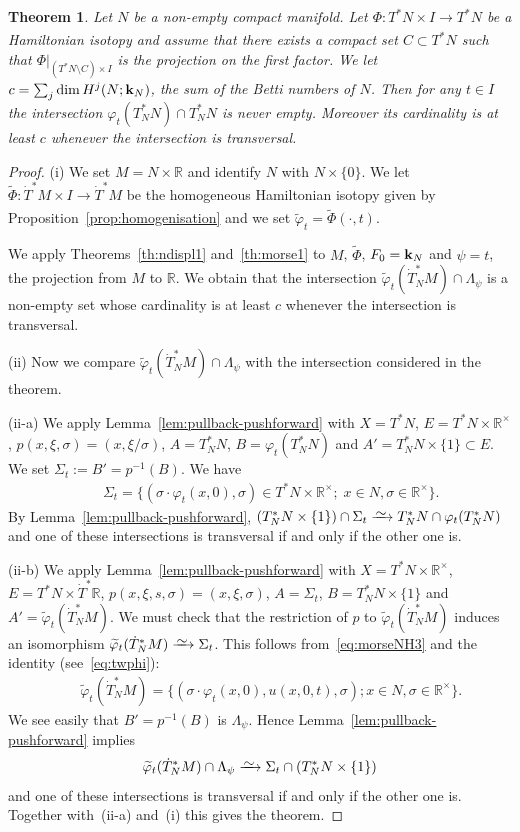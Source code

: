 \documentclass[12pt,leqno]{article}
\newtheorem{theorem}{Theorem}[section]
\theoremstyle{definition}
\newcommand{\R}{{\mathbb{R}}}
\def\phi{{\varphi}}
\newcommand{\cor}{{\bf k}}
\renewcommand{\to}[1][]{\xrightarrow[]{#1}}
\newcommand{\isoto}[1][]{\xrightarrow[#1]%
{{\raisebox{-.6ex}[0ex][-.6ex]{$\mspace{1mu}\sim\mspace{2mu}$}}}}
\newcommand{\opb}[1]{#1^{-1}}
\newcommand{\eqdot}{\mathbin{:=}}
\newcommand{\cl}{\colon}
\newcommand{\tw}[1]{\widetilde{#1}}
\newcommand{\eq}{\begin{eqnarray}}
\newcommand{\eneq}{\end{eqnarray}}
\newcommand{\eqn}{\begin{eqnarray*}}
\newcommand{\eneqn}{\end{eqnarray*}}
\newcommand{\dT}{{\dot{T}}}
\newcommand{\dTM}{{\dT}^*M}
\numberwithin{equation}{section}
\begin{document}
\begin{theorem}\label{thm:morseNH}
Let $N$ be a non-empty compact manifold.
Let $\Phi\cl T^*N\times I\to T^*N$ be a
Hamiltonian isotopy and assume that there exists a compact set $C\subset T^*N$ such
that $\Phi|_{(T^*N \setminus C) \times I}$ is the projection on the first
factor. We let $c=\sum_j\dim H^j(N;\cor_N)$, the sum
of the Betti numbers of $N$. 
Then for any $t\in I$ the intersection
$\phi_t(T^*_NN) \cap T^*_NN$ is never empty.
Moreover its cardinality is at
least $c$ whenever the intersection is transversal.
\end{theorem}
\begin{proof}
(i) We set $M=N\times \R$ and identify $N$ with $N\times\{0\}$.
We let $\tw\Phi\cl \dTM \times I \to \dTM$ be the homogeneous
Hamiltonian isotopy given by
Proposition~\ref{prop:homogenisation} and we set
$\tw\phi_t = \tw\Phi(\cdot,t)$.

We apply Theorems~\ref{th:ndispl1} and~\ref{th:morse1} to $M$, $\tw\Phi$,
$F_0 = \cor_N$ and $\psi = t$, the projection from $M$ to $\R$.
We obtain that the intersection $\tw\phi_t(\dT^*_NM) \cap \Lambda_\psi$
is a non-empty set whose cardinality is at least $c$ whenever
the intersection is transversal.
  
\medskip\noindent
(ii) Now we compare $\tw\phi_t(\dT^*_NM) \cap \Lambda_\psi$ with the
intersection considered in the theorem. 


\noindent
(ii-a)
We apply Lemma~\ref{lem:pullback-pushforward} with
$X = T^*N$, $E= T^*N \times \R^\times$, $p(x,\xi,\sigma) = (x,\xi/\sigma)$,
$A=T^*_NN$, $B= \phi_t(T^*_NN)$ and $A' = T^*_NN \times \{1\} \subset E$.
We set $\Sigma_t\eqdot B'=\opb{p}(B)$. We have
\eq\label{eq:morseNH3}
&&\Sigma_t=
\{(\sigma\cdot\phi_t(x,0),\sigma)\in T^*N\times\R^\times;\;
x\in N,\sigma\in\R^\times\}.
\eneq
By Lemma~\ref{lem:pullback-pushforward},
$(T^*_NN \times \{1\}) \cap \Sigma_t \isoto T^*_NN  \cap \phi_t(T^*_NN)$
and one of these intersections is transversal if and only if the other one
is.

\smallskip\noindent
(ii-b)
We apply Lemma~\ref{lem:pullback-pushforward} with
$X = T^*N\times \R^\times$, $E = T^*N \times \dT^*\R$,
$p(x,\xi,s,\sigma)=(x,\xi,\sigma)$,
$A=\Sigma_t$, $B = T^*_NN\times\{1\}$ and $A'=\tw\phi_t(\dT^*_NM)$.
We must check that the restriction of $p$ to $\tw\phi_t(\dT^*_NM)$ induces an
isomorphism $\tw\phi_t(\dT^*_NM)\isoto\Sigma_t$.
This follows from~\eqref{eq:morseNH3} and the identity
(see~\eqref{eq:twphi}):
\eqn
&&\tw\phi_t(\dT^*_NM)=
\{(\sigma\cdot\phi_t(x,0),u(x,0,t),\sigma); x\in N,\sigma\in \R^\times\}.
\eneqn
We see easily that $B'=\opb{p}(B)$ is  $\Lambda_\psi$.
Hence Lemma~\ref{lem:pullback-pushforward} implies
$$
\tw\phi_t(\dT^*_NM) \cap \Lambda_\psi \isoto 
\Sigma_t \cap (T^*_NN \times \{1\})
$$
and one of these intersections is transversal if and only if the other one
is. Together with~(ii-a) and~(i) this gives the theorem.
\end{proof}
\end{document}
